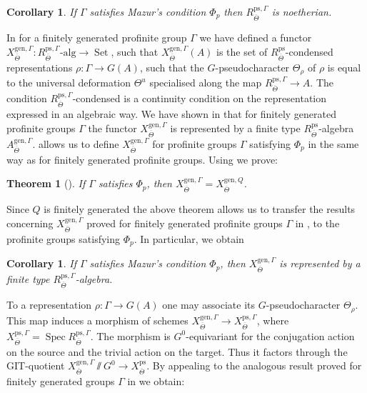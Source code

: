 \documentclass{amsart}
\newtheorem{cor}[prop]{Corollary}
\newtheorem{thm}[prop]{Theorem}
\theoremstyle{definition}
\theoremstyle{remark}
\DeclareMathOperator{\Spec}{Spec}
\DeclareMathOperator{\Set}{Set}
\newcommand{\alg}{\mathrm{alg}}
\newcommand{\gen}{\mathrm{gen}}
\newcommand{\Thetabar}{\overline{\Theta}}
\newcommand{\ps}{\mathrm{ps}}
\begin{document}
\begin{cor}\label{noeth_intro} If $\Gamma$ satisfies Mazur's  condition $\Phi_p$ then $R^{\ps, \Gamma}_{\Thetabar}$ is noetherian. 
\end{cor} 

In \cite{defG} for a finitely generated profinite group $\Gamma$ we have 
defined a functor $X^{\gen, \Gamma}_{\Thetabar}: R^{\ps, \Gamma}_{\Thetabar}\text{-}\alg \rightarrow \Set$,
such that $X^{\gen, \Gamma}_{\Thetabar}(A)$ is the set of 
$R^{\ps}_{\Thetabar}$-condensed 
representations $\rho: \Gamma \rightarrow G(A)$, such that the $G$-pseudocharacter 
$\Theta_{\rho}$ of $\rho$ is equal to the universal deformation $\Theta^u$ specialised along the map $R^{\ps, \Gamma}_{\Thetabar} \rightarrow A$. The condition 
$R^{\ps, \Gamma}_{\Thetabar}$-condensed is a continuity condition on the representation expressed in an algebraic way.  We have shown in \cite{defG} that for finitely generated profinite groups $\Gamma$  the functor $X^{\gen, \Gamma}_{\Thetabar}$ is represented by a finite type $R^{\ps}_{\Thetabar}$-algebra
$A^{\gen, \Gamma}_{\Thetabar}$.  allows us to 
define $X^{\gen,\Gamma}_{\Thetabar}$ for profinite groups $\Gamma$ satisfying $\Phi_p$
in the same way as for finitely generated profinite groups. Using 
 we prove: 

\begin{thm}[{}] If $\Gamma$ satisfies $\Phi_p$, then $X^{\gen, \Gamma}_{\Thetabar}= X^{\gen, Q}_{\Thetabar}$.
\end{thm} 

Since $Q$ is finitely generated the above theorem allows us to transfer the results concerning $X^{\gen, \Gamma}_{\Thetabar}$ proved for finitely generated profinite groups $\Gamma$ in \cite{defG}, \cite{inf_laf} to the profinite groups satisfying $\Phi_p$. In particular, we obtain

\begin{cor} If $\Gamma$ satisfies Mazur's condition $\Phi_p$, then $X^{\gen, \Gamma}_{\Thetabar}$ is 
represented by a finite type $R^{\ps, \Gamma}_{\Thetabar}$-algebra. 
\end{cor} 

To a representation $\rho: \Gamma \rightarrow G(A)$ one may associate its 
$G$-pseudocharacter $\Theta_{\rho}$. This map induces a morphism 
of schemes $X^{\gen, \Gamma}_{\Thetabar}\rightarrow X^{\ps, \Gamma}_{\Thetabar}$, 
where $X^{\ps, \Gamma}_{\Thetabar}=\Spec R^{\ps, \Gamma}_{\Thetabar}$. The morphism 
is $G^0$-equivariant for the conjugation action on the source and the trivial 
action on the target. Thus it factors through the GIT-quotient 
$X^{\gen, \Gamma}_{\Thetabar}\sslash G^0 \rightarrow X^{\ps}_{\Thetabar}$. 
By appealing to the analogous result proved for finitely generated groups 
$\Gamma$ in \cite{inf_laf} we obtain:
\end{document}

